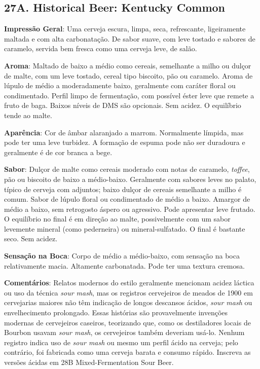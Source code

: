 \subsection*{27A. Historical Beer: Kentucky Common}
\textbf{Impressão Geral}: Uma cerveja escura, limpa, seca, refrescante, ligeiramente maltada e com alta carbonatação. De sabor suave, com leve tostado e sabores de caramelo, servida bem fresca como uma cerveja leve, de salão.

\textbf{Aroma}: Maltado de baixo a médio como cereais, semelhante a milho ou dulçor de malte, com um leve tostado, cereal tipo biscoito, pão ou caramelo. Aroma de lúpulo de médio a moderadamente baixo, geralmente com caráter floral ou condimentado. Perfil limpo de fermentação, com possível éster leve que remete a fruto de baga. Baixos níveis de DMS são opcionais. Sem acidez. O equilíbrio tende ao malte.

\textbf{Aparência}: Cor de âmbar alaranjado a marrom. Normalmente límpida, mas pode ter uma leve turbidez. A formação de espuma pode não ser duradoura e geralmente é de cor branca a bege.

\textbf{Sabor}: Dulçor de malte como cereais moderado com notas de caramelo, \textit{toffee}, pão ou biscoito de baixo a médio-baixo. Geralmente com sabores leves no palato, típico de cerveja com adjuntos; baixo dulçor de cereais semelhante a milho é comum. Sabor de lúpulo floral ou condimentado de médio a baixo. Amargor de médio a baixo, sem retrogosto áspero ou agressivo. Pode apresentar leve frutado. O equilíbrio no final é em direção ao malte, possivelmente com um sabor levemente mineral (como pederneira) ou mineral-sulfatado. O final é bastante seco. Sem acidez.

\textbf{Sensação na Boca}: Corpo de médio a médio-baixo, com sensação na boca relativamente macia. Altamente carbonatada. Pode ter uma textura cremosa.

\textbf{Comentários}: Relatos modernos do estilo geralmente mencionam acidez láctica ou uso da técnica \textit{sour mash}, mas os registros cervejeiros de meados de 1900 em cervejarias maiores não têm indicação de longos descansos ácidos, \textit{sour mash} ou envelhecimento prolongado. Essas histórias são provavelmente invenções modernas de cervejeiros caseiros, teorizando que, como os destiladores locais de Bourbon usavam \textit{sour mash}, os cervejeiros também deveriam usá-lo. Nenhum registro indica uso de \textit{sour mash} ou mesmo um perfil ácido na cerveja; pelo contrário, foi fabricada como uma cerveja barata e consumo rápido. Inscreva as versões ácidas em 28B Mixed-Fermentation Sour Beer.

